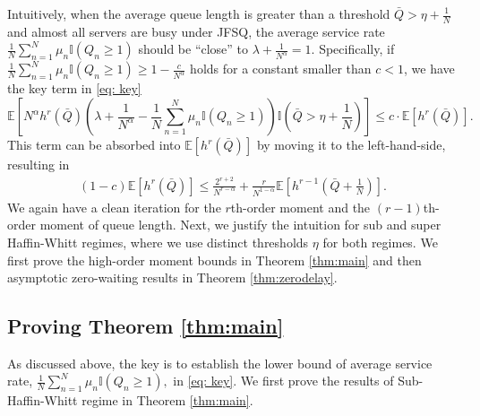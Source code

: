 \documentclass[11pt,oneside,letter]{article}
\begin{document}
Intuitively, when the average queue length is greater than a threshold ${\bar{Q} > \eta + \frac{1}{N}}$ and almost all servers are busy under JFSQ, the average service rate $\frac{1}{N} \sum_{n=1}^{N} \mu_n \mathbb{I}(Q_n \geq 1)$ should be ``close'' to $\lambda+\frac{1}{N^\alpha} = 1.$
Specifically, if $\frac{1}{N} \sum_{n=1}^{N} \mu_n \mathbb{I}(Q_n \geq 1) \geq 1-\frac{c}{N^\alpha}$ holds for a constant smaller than $c<1$, {we have the key term in \eqref{eq: key} 
$$\mathbb{E} \left[ N^{\alpha} h^r\left(\bar Q \right) \left(\lambda + \frac{1}{N^\alpha} - \frac{1}{N} \sum_{n=1}^{N} \mu_n \mathbb{I}(Q_n \geq 1) \right) \mathbb{I}({\bar{Q} > \eta + \frac{1}{N}}) \right]\leq c \cdot \mathbb{E} \left[ h^r\left(\bar Q \right)\right].$$
This term can be absorbed into $\mathbb{E}\left[h^r\left(\bar Q \right) \right]$ by moving it to the left-hand-side, resulting in  
\begin{align*}
(1-c)\mathbb{E}\left[h^r\left( \bar Q \right) \right] 
\leq \frac{2^{r+2}}{N^{r - \alpha}} 
+ \frac{r}{N^{1 - \alpha}} \mathbb{E} \left[ h^{r-1} \left( \bar{Q} + \frac{1}{N} \right) \right]. 
\end{align*}
We again have a clean iteration for the $r$th-order moment and the $(r-1)$th-order moment of queue length.}
Next, we justify the intuition for sub and super Haffin-Whitt regimes, where we use distinct thresholds $\eta$ for both regimes. 
We first prove the high-order moment bounds in Theorem \ref{thm:main} and then asymptotic zero-waiting results in Theorem \ref{thm:zerodelay}. 


\subsection{Proving Theorem \ref{thm:main}}
As discussed above, the key is to establish the lower bound of average service rate, $\frac{1}{N} \sum_{n=1}^{N} \mu_n \mathbb{I}(Q_n \geq 1),$ in \eqref{eq: key}. We first prove the results of Sub-Haffin-Whitt regime in Theorem \ref{thm:main}.   
\end{document}
